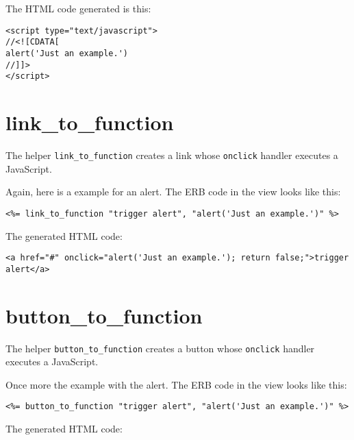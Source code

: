 \documentclass[a4paper]{book}
\begin{document}
The HTML code generated is this:

\begin{shaded}\begin{verbatim}
<script type="text/javascript">
//<![CDATA[
alert('Just an example.')
//]]>
</script>
\end{verbatim}\end{shaded}

\section{link\_to\_function}\label{linkux5ftoux5ffunction}

The helper \texttt{link\_to\_function} creates a link whose \texttt{onclick} handler executes a JavaScript.

Again, here is a example for an alert. The ERB code in the view looks like this:

\begin{shaded}\begin{verbatim}
<%= link_to_function "trigger alert", "alert('Just an example.')" %>
\end{verbatim}\end{shaded}

The generated HTML code:

\begin{shaded}\begin{verbatim}
<a href="#" onclick="alert('Just an example.'); return false;">trigger alert</a>
\end{verbatim}\end{shaded}

\section{button\_to\_function}\label{buttonux5ftoux5ffunction}

The helper \texttt{button\_to\_function} creates a button whose \texttt{onclick} handler executes a JavaScript.

Once more the example with the alert. The ERB code in the view looks like this:

\begin{shaded}\begin{verbatim}
<%= button_to_function "trigger alert", "alert('Just an example.')" %>
\end{verbatim}\end{shaded}

The generated HTML code:
\end{document}
